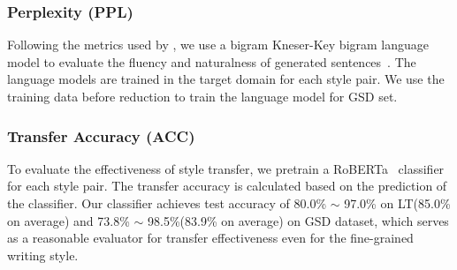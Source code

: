 \subsubsection*{Perplexity (PPL)}

Following the metrics used by \citet{john2018disentangled}, we use a bigram Kneser-Key bigram language model to evaluate the fluency and naturalness of generated sentences~\citep{kneser1995improved}. The language models are trained in the target domain for each style pair. We use the training data before reduction to train the language model for GSD set.


\subsubsection*{Transfer Accuracy (ACC)}

To evaluate the effectiveness of style transfer, we pretrain a RoBERTa~\citep{liu2019roberta} classifier for each style pair. The transfer accuracy is calculated based on the prediction of the classifier. Our classifier achieves test accuracy of 80.0\% $\sim$ 97.0\% on LT(85.0\% on average) and 73.8\% $\sim$ 98.5\%(83.9\% on average) on GSD dataset, which serves as a reasonable evaluator for transfer effectiveness even for the fine-grained writing style.

